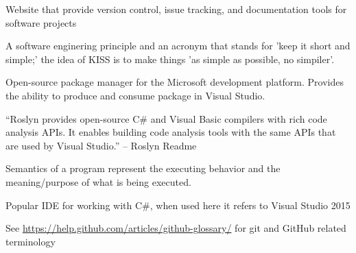 \documentclass[draftclsnofoot,onecolumn]{IEEEtran}
\begin{document}
\begin{description}
\item[GitHub:] Website that provide version control, issue tracking, and 
documentation tools for software projects

\item[KISS:] A software enginering principle and an acronym that stands for 
'keep it short and simple;' the idea of KISS is to make things 'as simple as 
possible, no simpiler'.

\item[NuGet Package:] Open-source package manager for the Microsoft 
development platform. Provides the ability to produce and consume package in 
Visual Studio.

\item[Roslyn:] “Roslyn provides open-source C\# and Visual Basic compilers 
with rich code analysis APIs. It enables building code analysis tools with 
the same APIs that are used by Visual Studio.” – Roslyn Readme 

\item[Semantics:] Semantics of a program represent the executing behavior and 
the meaning/purpose of what is being executed. 

\item[VS:] Popular IDE for working with C\#, when used here it refers to 
Visual Studio 2015

\end{description}

See \url{https://help.github.com/articles/github-glossary/} for git and 
GitHub related terminology
\end{document}
